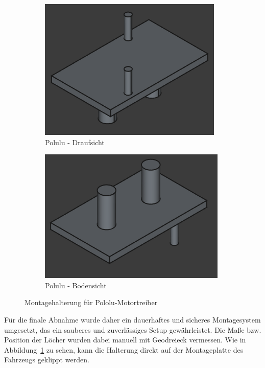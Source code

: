 \begin{figure}[h]
    \centering

    \begin{subfigure}[b]{0.25\textwidth}
        \centering
        \includegraphics[width=\textwidth]{images/cad_polulu_front.png}
        \caption{Polulu - Draufsicht}
    \end{subfigure}
    \hspace{0.05\textwidth} %
    \begin{subfigure}[b]{0.25\textwidth}
        \centering
        \includegraphics[width=\textwidth]{images/cad_polulu_back.png}
        \caption{Polulu - Bodensicht}
    \end{subfigure}

    \caption{Montagehalterung für Pololu-Motortreiber}
    \label{fig:pololu_mounting}
\end{figure}

Für die finale Abnahme wurde daher ein dauerhaftes und sicheres Montagesystem umgesetzt, das ein sauberes und zuverlässiges Setup gewährleistet. Die Maße bzw. Position der Löcher wurden dabei manuell mit Geodreieck vermessen. Wie in Abbildung~\ref{fig:pololu_mounting} zu sehen, kann die Halterung direkt auf der Montageplatte des Fahrzeugs geklippt werden.